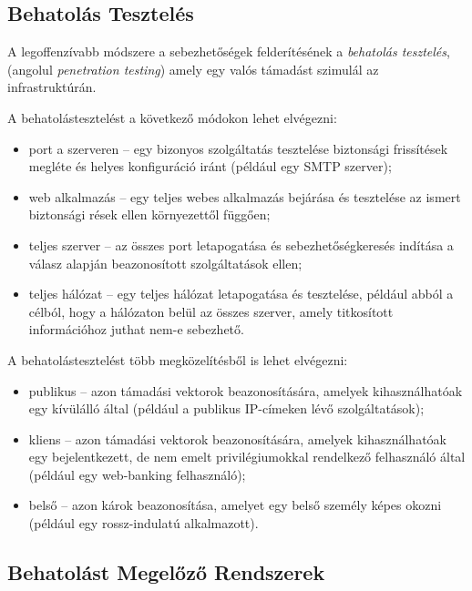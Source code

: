\subsection*{Behatolás Tesztelés}
	
	A legoffenzívabb módszere a sebezhetőségek felderítésének a \textit{behatolás tesztelés}, (angolul \textit{penetration testing}) amely egy valós támadást szimulál az infrastruktúrán.
	
	\noindent A behatolástesztelést a következő módokon lehet elvégezni:
	
	\begin{itemize}
		\item port a szerveren -- egy bizonyos szolgáltatás tesztelése biztonsági frissítések megléte és helyes konfiguráció iránt (például egy SMTP szerver);
		\item web alkalmazás -- egy teljes webes alkalmazás bejárása és tesztelése az ismert biztonsági rések ellen környezettől függően;
		\item teljes szerver -- az összes port letapogatása és sebezhetőségkeresés indítása a válasz alapján beazonosított szolgáltatások ellen;
		\item teljes hálózat -- egy teljes hálózat letapogatása és tesztelése, például abból a célból, hogy a hálózaton belül az összes szerver, amely titkosított információhoz juthat nem-e sebezhető.
	\end{itemize}
	
	\noindent A behatolástesztelést több megközelítésből is lehet elvégezni:
	
	\begin{itemize}
		\item publikus -- azon támadási vektorok beazonosítására, amelyek kihasználhatóak egy kívülálló által (például a publikus IP-címeken lévő szolgáltatások);
		\item kliens -- azon támadási vektorok beazonosítására, amelyek kihasználhatóak egy bejelentkezett, de nem emelt privilégiumokkal rendelkező felhasználó által (például egy web-banking felhasználó);
		\item belső -- azon károk beazonosítása, amelyet egy belső személy képes okozni (például egy rossz-indulatú alkalmazott).
	\end{itemize}

\subsection*{Behatolást Megelőző Rendszerek}
	
